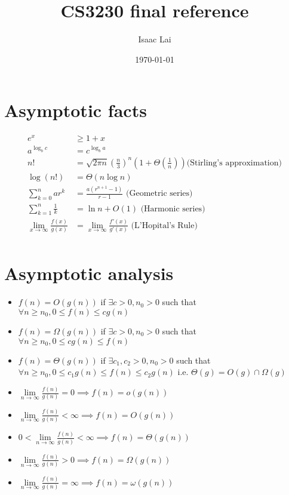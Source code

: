 \documentclass[11pt]{article}
\title{CS3230 final reference}
\date{\today}
\author{Isaac Lai}
\theoremstyle{remark}
\begin{document}
\maketitle
\section{Asymptotic facts}
\begin{align*}
    e^x&\geq 1+x\\
    a^{\log_b c}&=c^{\log_b a}\\
    n!&=\sqrt{2\pi n}\left(\frac{n}{3}\right)^n\left(1+\Theta\left(\frac{1}{n}\right)\right)\text{
    (Stirling's approximation)}\\
    \log(n!)&=\Theta(n\log n)\\
    \sum_{k=0}^n ar^k&= \frac{a(r^{n+1}-1)}{r-1}\text{ (Geometric series)}\\
    \sum_{k=1}^n \frac{1}{k}&=\ln n+O(1)\text{ (Harmonic series)}\\
    \lim_{x\to\infty}\frac{f(x)}{g(x)}&=\lim_{x\to\infty}\frac{f'(x)}{g'(x)}\text{ (L'Hopital's Rule)}\\
\end{align*}
\section{Asymptotic analysis}
\begin{itemize}
    \item $f(n)=O(g(n))$ if  $\exists c>0,n_0>0$ such that $\forall n\geq n_0, 0\leq f(n)\leq cg(n)$
    \item  $f(n)=\Omega(g(n))$ if  $\exists c>0,n_0>0$ such that $\forall n\geq n_0, 0\leq cg(n)\leq f(n)$
    \item  $f(n)=\Theta(g(n))$ if $\exists c_1,c_2>0,n_0>0$ such that $\forall n\geq n_0, 0\leq c_1g(n)\leq
        f(n)\leq c_2g(n)$ i.e. $\Theta(g)=O(g)\cap\Omega(g)$ 
    \item $\lim\limits_{n\to\infty}\frac{f(n)}{g(n)}=0\implies f(n)=o(g(n))$ 
    \item $\lim\limits_{n\to\infty}\frac{f(n)}{g(n)}<\infty\implies f(n)=O(g(n))$    
    \item $0<\lim\limits_{n\to\infty}\frac{f(n)}{g(n)}<\infty\implies f(n)=\Theta(g(n))$
    \item $\lim\limits_{n\to\infty}\frac{f(n)}{g(n)}>0\implies f(n)=\Omega(g(n))$  
    \item $\lim\limits_{n\to\infty}\frac{f(n)}{g(n)}=\infty\implies f(n)=\omega(g(n))$   
\end{itemize}
\end{document}
